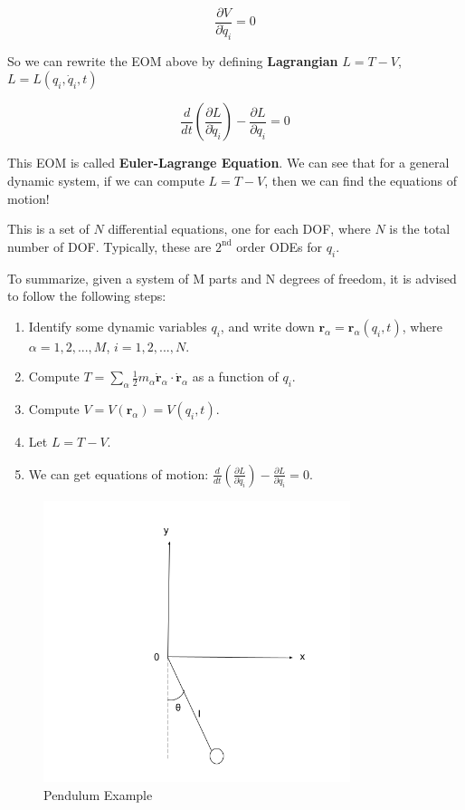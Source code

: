 \[
    \frac{\partial V}{\partial \dot{q}_i}=0
\]

So we can rewrite the EOM above by defining \textbf{Lagrangian} $L=T-V$, $L=L(q_i, \dot{q}_i, t)$

\[
    \frac{d}{dt} (\frac{\partial L}{\partial \dot{q}_i}) - \frac{\partial L}{\partial q_i} = 0
\]

This EOM is called \textbf{Euler-Lagrange Equation}. We can see that for a general dynamic system, if we can compute $L=T-V$, then we can find the equations of motion!

This is a set of $N$ differential equations, one for each DOF, where $N$ is the total number of DOF. Typically, these are $2^{\text{nd}}$ order ODEs for $q_i$.

To summarize, given a system of M parts and N degrees of freedom, it is advised to follow the following steps:

\begin{enumerate}
    \item Identify some dynamic variables $q_i$, and write down $\mathbf{r}_\alpha=\mathbf{r}_\alpha(q_i, t)$, where $\alpha=1,2,...,M$, $i=1,2,...,N$.
    \item Compute $T=\sum_\alpha \frac{1}{2} m_\alpha \dot{\mathbf{r}}_\alpha \cdot \dot{\mathbf{r}}_\alpha$ as a function of $q_i$.
    \item Compute $V=V(\mathbf{r}_\alpha)=V(q_i, t)$.
    \item Let $L=T-V$.
    \item We can get equations of motion: $\frac{d}{dt} (\frac{\partial L}{\partial \dot{q}_i}) - \frac{\partial L}{\partial q_i} = 0$.
\end{enumerate}

\begin{figure}[ht]
  \centering
  \includegraphics[width=0.8\textwidth]{images/2-1-1.png}
  \caption{Pendulum Example}
  \label{fig:2-1-1}
\end{figure}

